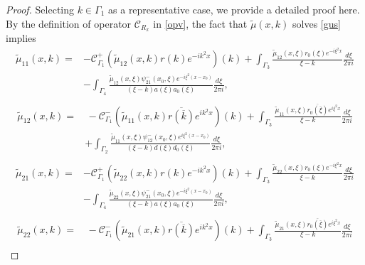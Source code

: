 \documentclass[preprint,compress,12pt]{elsarticle}
\numberwithin{equation}{section}
\begin{document}
\begin{proof}
Selecting $k\in\Gamma_{1}$ as a representative case, we provide a detailed proof here. By the definition of operator $\mathcal{C}_{R_{x}}$ in \eqref{opv}, the fact that $\tilde{\mu}(x,k)$ solves \eqref{gus} implies
\begin{equation}\label{mu11}
\begin{aligned}
\tilde{\mu}_{11}(x,k)=&-\mathcal{C}_{\Gamma_{1}}^{+}(\tilde{\mu}_{12}(x,k)r(k)e^{-ik^{2}x})(k)+\int_{\Gamma_{3}}\frac{\tilde{\mu}_{12}(x,\xi)r_{0}(\xi)e^{-i\xi^{2}x}}{\xi-k}\frac{d\xi}{2\pi i}\\
&-\int_{\Gamma_{4}}\frac{\tilde{\mu}_{12}(x,\xi)\psi_{21}^{-}(x_{0},\xi)e^{-i\xi^{2}(x-x_{0})}}{(\xi-k)a(\xi)a_{0}(\xi)}\frac{d\xi}{2\pi i},\\
\end{aligned}
\end{equation}
\begin{equation}\label{mu12}
\begin{aligned}
\tilde{\mu}_{12}(x,k)=&\,-\mathcal{C}_{\Gamma_{1}}^{-}(\tilde{\mu}_{11}(x,k)\overline{r(\overline{k})}e^{ik^{2}x})(k)+\int_{\Gamma_{3}}\frac{\tilde{\mu}_{11}(x,\xi)\overline{r_{0}(\overline{\xi})}e^{i\xi^{2}x}}{\xi-k}\frac{d\xi}{2\pi i}\\
&+\int_{\Gamma_{2}}\frac{\tilde{\mu}_{11}(x,\xi)\psi_{12}^{-}(x_{0},\xi)e^{i\xi^{2}(x-x_{0})}}{(\xi-k)d(\xi)d_{0}(\xi)}\frac{d\xi}{2\pi i},\\
\end{aligned}
\end{equation}
\begin{equation}\label{mu21}
\begin{aligned}
\tilde{\mu}_{21}(x,k)=&-\mathcal{C}_{\Gamma_{1}}^{+}(\tilde{\mu}_{22}(x,k)r(k)e^{-ik^{2}x})(k)+\int_{\Gamma_{3}}\frac{\tilde{\mu}_{22}(x,\xi)r_{0}(\xi)e^{-i\xi^{2}x}}{\xi-k}\frac{d\xi}{2\pi i}\\
&-\int_{\Gamma_{4}}\frac{\tilde{\mu}_{22}(x,\xi)\psi_{21}^{-}(x_{0},\xi)e^{-i\xi^{2}(x-x_{0})}}{(\xi-k)a(\xi)a_{0}(\xi)}\frac{d\xi}{2\pi i},\\
\end{aligned}
\end{equation}
\begin{equation}\label{mu22}
\begin{aligned}
\tilde{\mu}_{22}(x,k)=&\,-\mathcal{C}_{\Gamma_{1}}^{-}(\tilde{\mu}_{21}(x,k)\overline{r(\overline{k})}e^{ik^{2}x})(k)+\int_{\Gamma_{3}}\frac{\tilde{\mu}_{21}(x,\xi)\overline{r_{0}(\overline{\xi})}e^{i\xi^{2}x}}{\xi-k}\frac{d\xi}{2\pi i}\\

\end{aligned}
\end{equation}
\end{proof}
\end{document}
